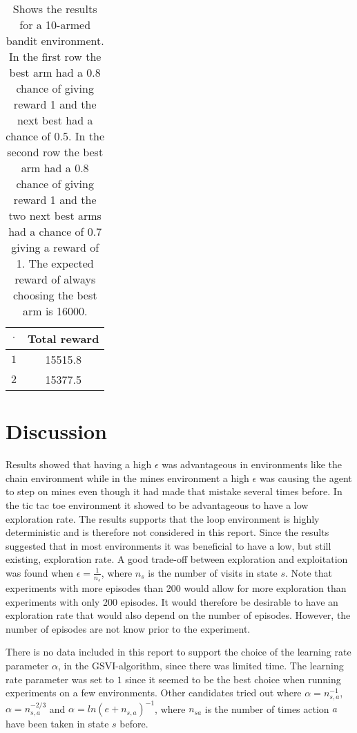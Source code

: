 \documentclass[11pt]{article}
\numberwithin{equation}{section}
\begin{document}
\begin{flushleft}
\begin{table}[H]
\caption{Shows the results for a 10-armed bandit environment. In the first row the best arm had a 0.8 chance of giving reward 1 and the next best had a chance of 0.5. In the second row the best arm had a 0.8 chance of giving reward 1 and the two next best arms had a chance of 0.7 giving a reward of 1. The expected reward of always choosing the best arm is 16000.}
\begin{center}
\begin{tabular}{|c|c|}
\hline
$\cdot$ & Total reward \\ \hline
$1$ & 15515.8 \\ \hline
$2$ & 15377.5 \\
\hline
\end{tabular}
\label{tab:UCBMean}
\end{center}
\end{table}

\section{Discussion}

Results showed that having a high $\epsilon$ was advantageous in environments like the chain environment while in the mines environment a high $\epsilon$ was causing the agent to step on mines even though it had made that mistake several times before. In the tic tac toe environment it showed to be advantageous to have a low exploration rate. The results supports that the loop environment is highly deterministic and is therefore not considered in this report. Since the results suggested that in most environments it was beneficial to have a low, but still existing, exploration rate. A good trade-off between exploration and exploitation was found when $\epsilon = \frac{1}{n_s}$, where $n_s$ is the number of visits in state $s$. Note that experiments with more episodes than 200 would allow for more exploration than experiments with only 200 episodes. It would therefore be desirable to have an exploration rate that would also depend on the number of episodes. However, the number of episodes are not know prior to the experiment. \newline

There is no data included in this report to support the choice of the learning rate parameter $\alpha$, in the GSVI-algorithm, since there was limited time. The learning rate parameter was set to $1$ since it seemed to be the best choice when running experiments on a few environments. Other candidates tried out where $\alpha = n_{s,a}^{-1}$, $\alpha = n_{s,a}^{-2/3}$ and $\alpha = ln(e + n_{s,a})^{-1}$, where $n_{sa}$ is the number of times action $a$ have been taken in state $s$ before. \newline 


\end{flushleft}
\end{document}

